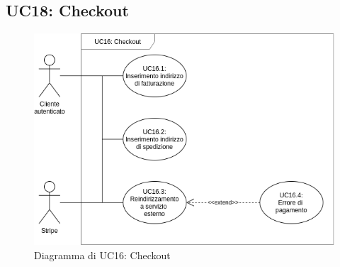         \subsection{UC18: Checkout}
        \label{sec:UC18}
            \begin{figure}[!ht]
                \caption{Diagramma di UC16: Checkout}
                \vspace{10px}
                \includegraphics[scale=0.5]{../../../Images/AnalisiRequisiti/UC18}
                \centering
            \end{figure}
